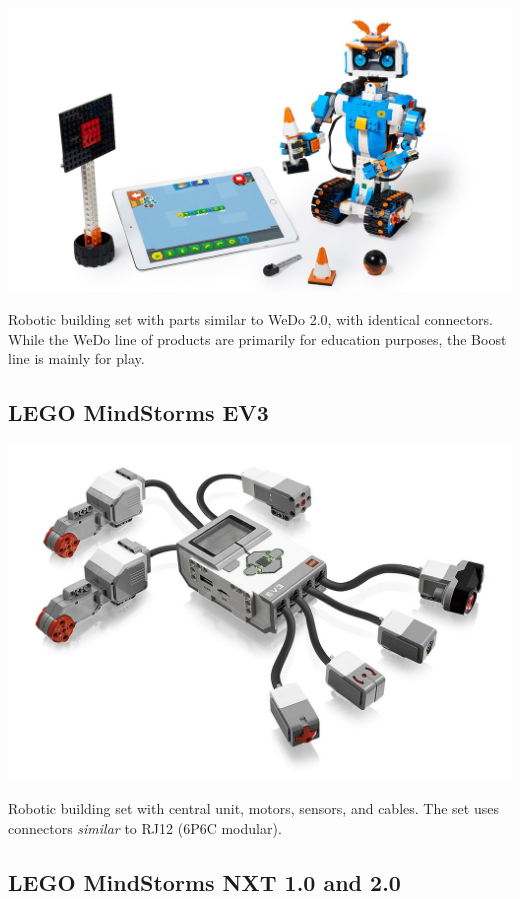 \documentclass[a4paper,12pt]{article}
\begin{document}
\includegraphics[width=13.5cm]{lego-boost.jpg}

Robotic building set with parts similar to WeDo 2.0, with identical connectors.
While the WeDo line of products are primarily for education purposes, the Boost
line is mainly for play.

\subsection{LEGO MindStorms EV3}

\includegraphics[width=13.5cm]{lego-mindstorms-ev3.jpg}

Robotic building set with central unit, motors, sensors, and cables. The set
uses connectors \emph{similar} to RJ12 (6P6C modular).

\subsection{LEGO MindStorms NXT 1.0 and 2.0}
\end{document}
